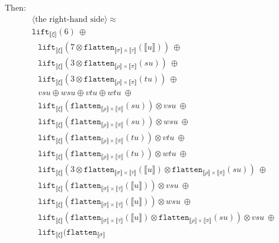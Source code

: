 \documentclass[a4paper,UKenglish,cleveref,autoref,numberwithinsect]{lipics-v2019}
\theoremstyle{definition}
\newcommand{\flatten}{\mathtt{flatten}}
\newcommand{\lift}{\mathtt{lift}}
\newcommand{\typeinterpret}[1]{\llbracket #1 \rrbracket}
\newcommand{\interpret}[1]{\llbracket #1 \rrbracket}
\begin{document}
\begin{itemize}
  \medskip
  Then:
  \[
  \begin{array}{l}
  \langle\text{the right-hand side}\rangle \approx \\
  \lift_{\typeinterpret{\xi}}(6)\ \oplus \\
  \phantom{A}
    \lift_{\typeinterpret{\xi}}(7 \otimes \flatten_{\typeinterpret{
    \sigma} \times \typeinterpret{\tau}}(\interpret{u}))\ \oplus \\
  \phantom{A}
    \lift_{\typeinterpret{\xi}}(3 \otimes \flatten_{
    \typeinterpret{\rho} \times \typeinterpret{\pi}}(su))\ \oplus \\
  \phantom{A}
    \lift_{\typeinterpret{\xi}}(3 \otimes \flatten_{
    \typeinterpret{\rho} \times \typeinterpret{\pi}}(tu))\ \oplus \\
  \phantom{A}
    vsu \oplus wsu \oplus
    vtu \oplus wtu\ \oplus \\
  \phantom{A}
    \lift_{\typeinterpret{\xi}}(\flatten_{\typeinterpret{\rho} \times
    \typeinterpret{\pi}}(su)) \otimes vsu\ \oplus \\
  \phantom{A}
    \lift_{\typeinterpret{\xi}}(\flatten_{\typeinterpret{\rho}
    \times \typeinterpret{\pi}}(su)) \otimes wsu\ \oplus \\
  \phantom{A}
    \lift_{\typeinterpret{\xi}}(\flatten_{\typeinterpret{\rho} \times
    \typeinterpret{\pi}}(tu)) \otimes vtu\ \oplus \\
  \phantom{A}
    \lift_{\typeinterpret{\xi}}(\flatten_{\typeinterpret{\rho}
    \times \typeinterpret{\pi}}(tu)) \otimes wtu\ \oplus \\
  \phantom{A}
    \lift_{\typeinterpret{\xi}}(3 \otimes \flatten_{
    \typeinterpret{\sigma} \times \typeinterpret{\tau}}(
    \interpret{u}) \otimes \flatten_{
    \typeinterpret{\rho} \times \typeinterpret{\pi}}(su))\ \oplus \\
  \phantom{A}
    \lift_{\typeinterpret{\xi}}(\flatten_{\typeinterpret{\sigma}
    \times \typeinterpret{\tau}}(\interpret{u})) \otimes vsu\ \oplus \\
  \phantom{A}
    \lift_{\typeinterpret{\xi}}(\flatten_{\typeinterpret{\sigma}
    \times \typeinterpret{\tau}}(\interpret{u})) \otimes wsu\ \oplus \\
  \phantom{A}
    \lift_{\typeinterpret{\xi}}(\flatten_{\typeinterpret{\sigma}
    \times \typeinterpret{\tau}}(\interpret{u}) \otimes
    \flatten_{\typeinterpret{\rho} \times
    \typeinterpret{\pi}}(su)) \otimes vsu\ \oplus \\
  \phantom{A}
    \lift_{\typeinterpret{\xi}}(\flatten_{\typeinterpret{\sigma}
}
\end{array}\]
\end{itemize}
\end{document}

